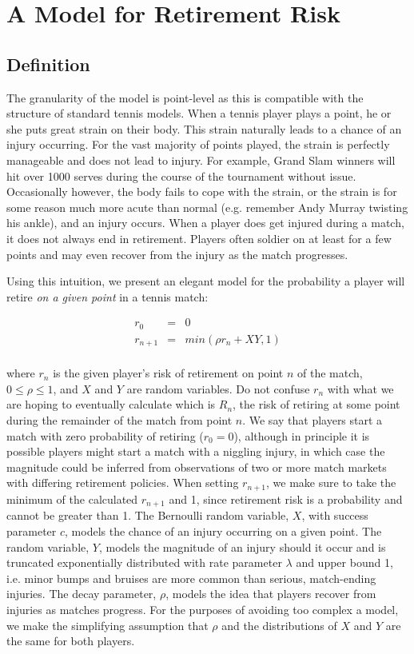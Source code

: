 \documentclass[letterpaper,12pt]{article}
\begin{document}
\section{A Model for Retirement Risk}

\subsection{Definition}

The granularity of the model is point-level as this is compatible with the structure of standard tennis models.  When a tennis player plays a point, he or she puts great strain on their body.  This strain naturally leads to a chance of an injury occurring.  For the vast majority of points played, the strain is perfectly manageable and does not lead to injury.  For example, Grand Slam winners will hit over 1000 serves during the course of the tournament without issue.  Occasionally however, the body fails to cope with the strain, or the strain is for some reason much more acute than normal (e.g. remember Andy Murray twisting his ankle), and an injury occurs.  When a player does get injured during a match, it does not always end in retirement.  Players often soldier on at least for a few points and may even recover from the injury as the match progresses.

Using this intuition, we present an elegant model for the probability a player will retire \textit{on a given point} in a tennis match:

\begin{center}
\begin{eqnarray*}
r_0 &=& 0 \\
r_{n+1} &=& min(\rho r_n + XY, 1) \\
\end{eqnarray*}
\end{center}

where $r_n$ is the given player's risk of retirement on point $n$ of the match, $0 \leq \rho \leq 1$, and $X$ and $Y$ are random variables.  Do not confuse $r_n$ with what we are hoping to eventually calculate which is $R_n$, the risk of retiring at some point during the remainder of the match from point $n$.  We say that players start a match with zero probability of retiring ($r_0 = 0$), although in principle it is possible players might start a match with a niggling injury, in which case the magnitude could be inferred from observations of two or more match markets with differing retirement policies.  When setting $r_{n+1}$, we make sure to take the minimum of the calculated $r_{n+1}$ and 1, since retirement risk is a probability and cannot be greater than 1.  The Bernoulli random variable, $X$, with success parameter $c$, models the chance of an injury occurring on a given point.  The random variable, $Y$, models the magnitude of an injury should it occur and is truncated exponentially distributed with rate parameter $\lambda$ and upper bound 1, i.e. minor bumps and bruises are more common than serious, match-ending injuries.  The decay parameter, $\rho$, models the idea that players recover from injuries as matches progress.  For the purposes of avoiding too complex a model, we make the simplifying assumption that $\rho$ and the distributions of $X$ and $Y$ are the same for both players.
\end{document}
